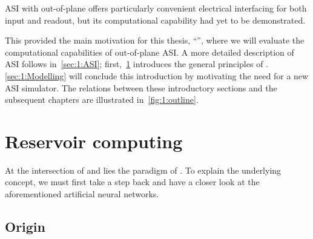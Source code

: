 ASI with out-of-plane  offers particularly convenient electrical interfacing for both input and readout, but its computational capability had yet to be demonstrated. \par %
This provided the main motivation for this thesis, ``\!\emph{\phdtitle}'', where we will evaluate the computational capabilities of out-of-plane ASI.
A more detailed description of ASI follows in~\cref{sec:1:ASI}; first,~\cref{sec:1:RC} introduces the general principles of .
\cref{sec:1:Modelling} will conclude this introduction by motivating the need for a new ASI simulator.
The relations between these introductory sections and the subsequent chapters are illustrated in~\cref{fig:1:outline}. \\\par

\vspace*{\fill}
\vspace*{\fill}

\newpage
\section{Reservoir computing}\label{sec:1:RC}
At the intersection of  and  lies the paradigm of .
To explain the underlying concept, we must first take a step back and have a closer look at the aforementioned artificial neural networks.

\subsection{Origin}
